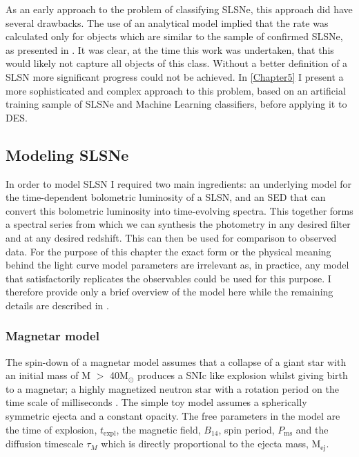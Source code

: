 As an early approach to the problem of classifying SLSNe, this approach did have several drawbacks. The use of an analytical model implied that the rate was calculated only for objects which are similar to the sample of confirmed SLSNe, as presented in . It was clear, at the time this work was undertaken, that this would likely not capture all objects of this class. Without a better definition of a SLSN more significant progress could not be achieved. In \cref{Chapter5} I present a more sophisticated and complex approach to this problem, based on an artificial training sample of SLSNe and Machine Learning classifiers, before applying it to DES.

\subsection{Modeling SLSNe}
In order to model SLSN I required two main ingredients: an underlying model for the time-dependent bolometric luminosity of a SLSN, and an SED that can convert this bolometric luminosity into time-evolving spectra. This together forms a spectral series from which we can synthesis the photometry in any desired filter and at any desired redshift. This can then be used for comparison to observed data. For the purpose of this chapter the exact form or the physical meaning behind the light curve model parameters are irrelevant as, in practice, any model that satisfactorily replicates the observables could be used for this purpose. I therefore provide only a brief overview of the model here while the remaining details are described in .

\subsubsection{Magnetar model}
The spin-down of a magnetar model assumes that a collapse of a giant star with an initial mass of M $>$ 40M$_{\odot}$ produces a SNIc like explosion whilst giving birth to a magnetar; a highly magnetized neutron star with a rotation period on the time scale of milliseconds \citep{Kasen2009,Woosley2010,Inserra2013}. The simple toy model assumes a spherically symmetric ejecta and a constant opacity. The free parameters in the model are the time of explosion, $t_{\mathrm{expl}}$, the magnetic field, $B_{14}$, spin period, $P_{\mathrm{ms}}$ and the diffusion timescale $\tau_M$ which is directly proportional to the ejecta mass, M$_{\mathrm{ej}}$.

